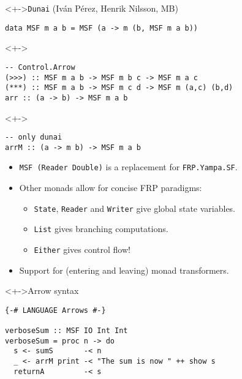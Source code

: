 \documentclass{enigtex-beamer-base}
\begin{document}
\begin{frame}[fragile]
\begin{block}<+->{\texttt{Dunai} (Iván Pérez, Henrik Nilsson, MB)}
\begin{verbatim}
data MSF m a b = MSF (a -> m (b, MSF m a b))
\end{verbatim}
\end{block}
\begin{block}<+->{}
\begin{verbatim}
-- Control.Arrow
(>>>) :: MSF m a b -> MSF m b c -> MSF m a c
(***) :: MSF m a b -> MSF m c d -> MSF m (a,c) (b,d)
arr :: (a -> b) -> MSF m a b
\end{verbatim}
\end{block}
\begin{block}<+->{}
\begin{verbatim}
-- only dunai
arrM :: (a -> m b) -> MSF m a b
\end{verbatim}
\end{block}
\begin{itemize}[<+->]
	\item \texttt{MSF (Reader Double)} is a replacement for \texttt{FRP.Yampa.SF}.
	\item Other monads allow for concise FRP paradigms:
		\begin{itemize}[<+->]
			\item \texttt{State}, \texttt{Reader} and \texttt{Writer} give global state variables.
			\item \texttt{List} gives branching computations.
			\item \texttt{Either} gives control flow!
		\end{itemize}
	\item Support for (entering and leaving) monad transformers.
\end{itemize}
\end{frame}

\begin{frame}[fragile]
\begin{block}<+->{Arrow syntax}
\begin{verbatim}
{-# LANGUAGE Arrows #-}

verboseSum :: MSF IO Int Int
verboseSum = proc n -> do
  s <- sumS       -< n
  _ <- arrM print -< "The sum is now " ++ show s
  returnA         -< s
\end{verbatim}
\end{block}
\end{frame}
\end{document}
